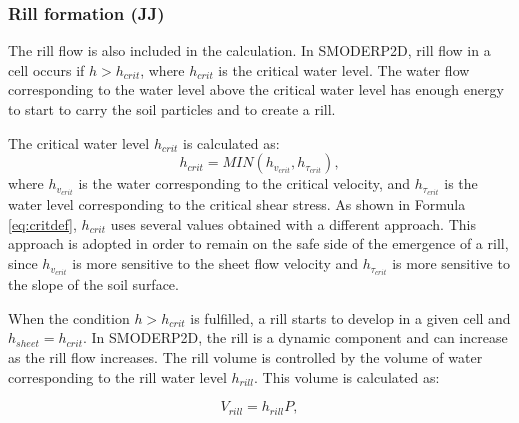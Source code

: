         \subsubsection{Rill formation (JJ)}

            The rill flow is also included in the calculation. In SMODERP2D, rill flow in a
            cell occurs if $h>h_{crit}$, where $h_{crit}$ is the critical water level. The
            water flow corresponding to the water level above the critical water level has
            enough energy to start to carry the soil particles and to create a rill.

            The critical water level $h_{crit}$ is calculated as:
            \begin{equation}
              h_{crit} = MIN(h_{v_{crit}},h_{\tau_{crit}}),
              \label{eq:critdef}
            \end{equation}
            where $h_{v_{crit}}$ is the water corresponding to the critical velocity, and
            $h_{\tau_{crit}}$ is the water level corresponding to the critical shear
            stress.  As shown in Formula \ref{eq:critdef}, $h_{crit}$ uses several values
            obtained with a different approach. This approach is adopted in order to remain
            on the safe side of the emergence of a rill, since $h_{v_{crit}}$ is more
            sensitive to the sheet flow velocity and $h_{\tau_{crit}}$ is more sensitive to
            the slope of the soil surface. 

            When the condition $h>h_{crit}$ is fulfilled, a rill starts to develop in a
            given cell and $h_{sheet}=h_{crit}$. In SMODERP2D, the rill is a dynamic component and
            can increase as the rill flow increases. The rill volume is controlled by the
            volume of water corresponding to the rill water level $h_{rill}$. This volume is
            calculated as:


            \begin{equation}
              V_{rill} = h_{rill}P,
              \label{eq:rillvol}
            \end{equation}

